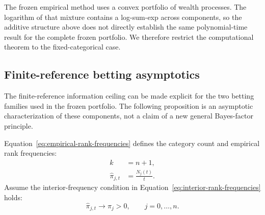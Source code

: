 The frozen empirical method uses a convex portfolio of wealth processes. The logarithm of that mixture contains a log-sum-exp across components, so the additive structure above does not directly establish the same polynomial-time result for the complete frozen portfolio. We therefore restrict the computational theorem to the fixed-categorical case.

\subsection{Finite-reference betting asymptotics}

The finite-reference information ceiling can be made explicit for the two betting families used in the frozen portfolio. The following proposition is an asymptotic characterization of these components, not a claim of a new general Bayes-factor principle.

Equation~\eqref{eq:empirical-rank-frequencies} defines the category count and empirical rank frequencies:
\begin{equation}
\begin{aligned}
k&=n+1,\\
\widehat\pi_{j,t}&=\frac{N_j(t)}{t}.
\end{aligned}
\label{eq:empirical-rank-frequencies}
\end{equation}
Assume the interior-frequency condition in Equation~\eqref{eq:interior-rank-frequencies} holds:
\begin{equation}
  \widehat\pi_{j,t}\longrightarrow\pi_j>0,
  \qquad j=0,\ldots,n.
  \label{eq:interior-rank-frequencies}
\end{equation}

